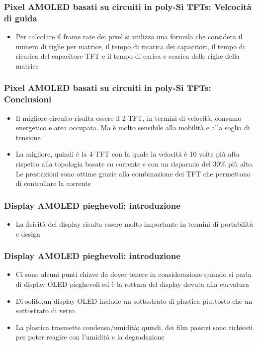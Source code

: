 \documentclass[12pt]{beamer}
\begin{document}
	\begin{frame}
		\frametitle{Pixel AMOLED basati su circuiti in poly-Si TFTs: Velcocità di guida}
		\begin{itemize}
			\item Per calcolare il frame rate dei pixel	si utilizza una formula che considera il numero di righe per matrice, il tempo di ricarica dei capacitori, il tempo di ricarica del capacitore TFT e il tempo di carica e scarica delle righe della matrice
		\end{itemize}
	\end{frame}
	\begin{frame}
		\frametitle{Pixel AMOLED basati su circuiti in poly-Si TFTs: Conclusioni}
		\begin{itemize}
			\item Il migliore circuito risulta essere il 2-TFT, in termini di velocità, consumo energetico e area occupata. Ma è molto sensibile alla mobilità e alla soglia di tensione
			\pause
			\item La migliore, quindi è la 4-TFT con la quale la velocità è 10 volte più alta rispetto alla
			topologia basate su corrente e con un risparmio del 30\% più alto. Le prestazioni sono ottime grazie alla combinazione dei TFT che permettono di controllare la corrente
		\end{itemize}
	\end{frame}
	\begin{frame}
		\frametitle{Display AMOLED pieghevoli: introduzione}
		\begin{itemize}
			\item La fisicità del display risulta essere molto importante in termini di portabilità e design
		\end{itemize}
	\end{frame}
	\begin{frame}
		\frametitle{Display AMOLED pieghevoli: introduzione}
		\begin{itemize}
			\item Ci sono alcuni punti chiave da dover tenere in considerazione quando si parla di display OLED pieghevoli ed è la rottura del display dovuta alla curvatura
			\pause
			\item Di solito,un display OLED include un sottostrato di plastica piuttosto che un sottostrato di vetro
			\pause
			\item La plastica trasmette condensa/umidità; quindi, dei film passivi sono richiesti per poter reagire con l’umidità e la degradazione
		\end{itemize}
	\end{frame}
\end{document}

